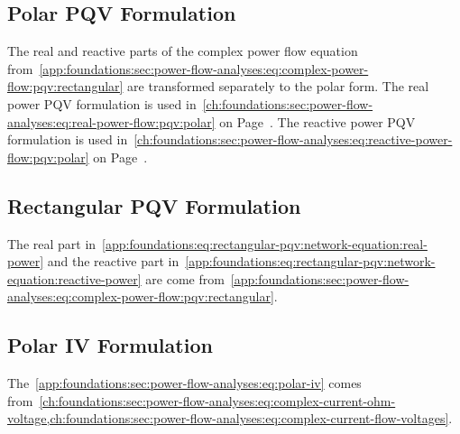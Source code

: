 \subsection{Polar PQV Formulation} 
% 
The real and reactive parts of the complex power flow equation
from~\cref{app:foundations:sec:power-flow-analyses:eq:complex-power-flow:pqv:rectangular}
are transformed separately to the polar form. The real power PQV formulation is
used
in~\cref{ch:foundations:sec:power-flow-analyses:eq:real-power-flow:pqv:polar} on
Page~\pageref{ch:foundations:sec:power-flow-analyses:eq:real-power-flow:pqv:polar}.
The reactive power PQV formulation is used
in~\cref{ch:foundations:sec:power-flow-analyses:eq:reactive-power-flow:pqv:polar}
on Page~\pageref{ch:foundations:sec:power-flow-analyses:eq:reactive-power-flow:pqv:polar}.
% 
\begin{subequations}
    
    \label{app:foundations:sec:power-flow-analyses:eq:polar-pqv}
\end{subequations}
% 
\clearpage
% 
\subsection{Rectangular PQV Formulation} 
% 
The real part
in~\cref{app:foundations:eq:rectangular-pqv:network-equation:real-power} and the
reactive part
in~\cref{app:foundations:eq:rectangular-pqv:network-equation:reactive-power} are
come from~\cref{app:foundations:sec:power-flow-analyses:eq:complex-power-flow:pqv:rectangular}.
%
\begin{subequations}
    
    \label{app:foundations:sec:power-flow-analyses:eq:rectangular-pqv}
\end{subequations}
% 
\clearpage
% 
\subsection{Polar IV Formulation} 
% 
The~\cref{app:foundations:sec:power-flow-analyses:eq:polar-iv} comes
from~\cref{ch:foundations:sec:power-flow-analyses:eq:complex-current-ohm-voltage,ch:foundations:sec:power-flow-analyses:eq:complex-current-flow-voltages}.
% 
\begin{subequations}
    
    \label{app:foundations:sec:power-flow-analyses:eq:polar-iv}
\end{subequations}
% 
\clearpage
%
